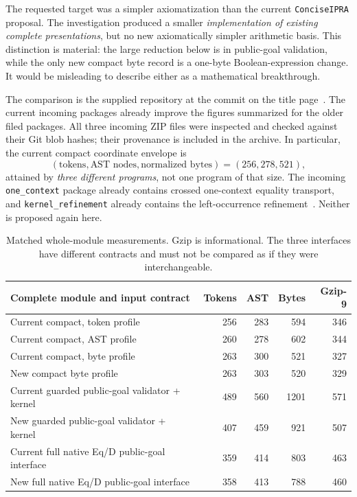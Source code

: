 \documentclass[11pt,letterpaper]{article}
\theoremstyle{definition}\newtheorem{definition}[theorem]{Definition}
\theoremstyle{remark}\newtheorem{remark}[theorem]{Remark}
\begin{document}
The requested target was a simpler axiomatization than the current
\texttt{ConciseIPRA} proposal. The investigation produced a smaller
\emph{implementation of existing complete presentations}, but no new
axiomatically simpler arithmetic basis. This distinction is material:
the large reduction below is in public-goal validation, while the only
new compact byte record is a one-byte Boolean-expression change.
It would be misleading to describe either as a mathematical breakthrough.

The comparison is the supplied repository at the commit on the title
page~\cite{snapshot}. The current incoming packages already improve the
figures summarized for the older filed packages. All three incoming ZIP
files were inspected and checked against their Git blob hashes; their
provenance is included in the archive. In particular, the current compact
coordinate envelope is
\[
 (\text{tokens},\text{AST nodes},\text{normalized bytes})=(256,278,521),
\]
attained by \emph{three different programs}, not one program of that size.
The incoming \texttt{one\_context} package already contains crossed
one-context equality transport, and \texttt{kernel\_refinement} already
contains the left-occurrence refinement~\cite{incoming}.
Neither is proposed again here.

\begin{table}[ht]
\centering\small
\begin{tabular}{lrrrr}
\toprule
Complete module and input contract & Tokens & AST & Bytes & Gzip-9\\
\midrule
Current compact, token profile &256&283&594&346\\
Current compact, AST profile &260&278&602&344\\
Current compact, byte profile &263&300&521&327\\
New compact byte profile &263&303&520&329\\
\midrule
Current guarded public-goal validator + kernel &489&560&1201&571\\
New guarded public-goal validator + kernel &407&459&921&507\\
\midrule
Current full native Eq/D public-goal interface &359&414&803&463\\
New full native Eq/D public-goal interface &358&413&788&460\\
\bottomrule
\end{tabular}
\caption{Matched whole-module measurements. Gzip is informational. The
three interfaces have different contracts and must not be compared as
if they were interchangeable.}
\label{tab:metrics}
\end{table}
\end{document}
